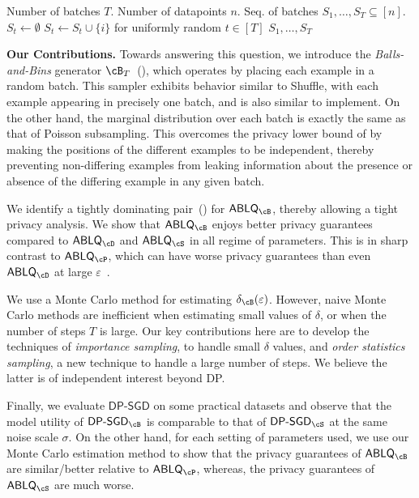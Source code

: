 \documentclass[twoside]{article}
\newcommand{\PARAMETERS}{\STATE \hspace{-3.5mm}{\bf Params:}\xspace}
\theoremstyle{definition}
\newcommand{\eps}{\varepsilon}
\newcommand{\BnB}{Balls-and-Bins\xspace}
\newcommand{\DPSGD}{\mathsf{DP}\text{-}\mathsf{SGD}}
\newcommand{\ABLQ}{\mathsf{ABLQ}}
\newcommand{\DPSGDS}{\DPSGD_{\cS}}
\newcommand{\DPSGDB}{\DPSGD_{\cB}}
\newcommand{\ABLQD}{\ABLQ_{\cD}}
\newcommand{\ABLQP}{\ABLQ_{\cP}}
\newcommand{\ABLQS}{\ABLQ_{\cS}}
\newcommand{\ABLQB}{\ABLQ_{\cB}}
\newcommand{\deltaB}{\delta_{\cB}}
\begin{document}
\begin{algorithm}[t]
\caption{$\cB_{T}$: \BnB Sampler}
\label{alg:bnb-batch}
\begin{algorithmic}
\PARAMETERS Number of batches $T$.
\REQUIRE Number of datapoints $n$.
\ENSURE Seq. of batches $S_1, \ldots, S_T \subseteq [n]$.
    \STATE $S_{t} \gets \emptyset$
\ENDFOR
{}
    \STATE $S_{t} \gets S_t \cup \{i\}$ for uniformly random $t \in [T]$
\ENDFOR
\RETURN $S_1, \ldots, S_T$
\end{algorithmic}
\end{algorithm}

{\bf Our Contributions.}
Towards answering this question, we introduce the {\em \BnB} generator $\cB_{T}$~(), which operates by placing each example in a random batch. This sampler exhibits behavior similar to Shuffle, with each example appearing in precisely one batch, and is also similar to implement. On the other hand, the marginal distribution over each batch is exactly the same as that of Poisson subsampling. This overcomes the privacy lower bound of \cite{chua24private, lebeda2024avoiding} by making the positions of the different examples to be independent, thereby preventing non-differing examples from leaking information about the presence or absence of the differing example in any given batch. 

We identify a tightly dominating pair~() for $\ABLQB$, thereby allowing a tight privacy analysis. We show that $\ABLQB$ enjoys better privacy guarantees compared to $\ABLQD$ and $\ABLQS$ in all regime of parameters. This is in sharp contrast to $\ABLQP$, which can have worse privacy guarantees than even $\ABLQD$ at large $\eps$~\citep{chua24private}.

We use a Monte Carlo method for estimating  $\deltaB(\eps)$. However, naive Monte Carlo methods are inefficient when estimating small values of $\delta$, or when the number of steps $T$ is large.
Our key contributions here are to develop the techniques of {\em importance sampling}, to handle small $\delta$ values, and {\em order statistics sampling}, a new technique to handle a large number of steps. We believe the latter is of independent interest beyond DP.

Finally, we evaluate $\DPSGD$ on some practical datasets and observe that the model utility of $\DPSGDB$ is comparable to that of $\DPSGDS$
at the same noise scale $\sigma$.
On the other hand, for each setting of parameters used, we use our Monte Carlo estimation method to show that the privacy guarantees of $\ABLQB$ are similar/better relative to $\ABLQP$, whereas, the privacy guarantees of $\ABLQS$ are much worse.
\end{document}
